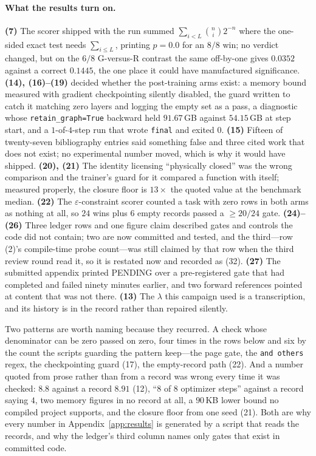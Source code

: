 \documentclass{article}
\begin{document}
\paragraph{What the results turn on.}
\textbf{(7)} The scorer shipped with the run summed $\sum_{i<L}\binom{n}{i}2^{-n}$ where
the one-sided exact test needs $\sum_{i\le L}$, printing $p = 0.0$ for an $8/8$ win; no
verdict changed, but on the $6/8$ G-versus-R contrast the same off-by-one gives $0.0352$
against a correct $0.1445$, the one place it could have manufactured significance.
\textbf{(14), (16)--(19)} decided whether the post-training arms exist: a memory bound
measured with gradient checkpointing silently disabled, the guard written to catch it
matching zero layers and logging the empty set as a pass, a diagnostic whose
\texttt{retain\_graph=True} backward held $91.67$\,GB against $54.15$\,GB at step start,
and a $1$-of-$4$-step run that wrote \texttt{final} and exited $0$.  \textbf{(15)}
Fifteen of twenty-seven bibliography entries said something false and three cited work
that does not exist; no experimental number moved, which is why it would have shipped.
\textbf{(20), (21)} The identity licensing ``physically closed'' was the wrong
comparison and the trainer's guard for it compared a function with itself; measured
properly, the closure floor is $13\times$ the quoted value at the benchmark median.
\textbf{(22)} The $\varepsilon$-constraint scorer counted a task with zero rows in both
arms as nothing at all, so $24$ wins plus $6$ empty records passed a $\ge 20/24$ gate.
\textbf{(24)--(26)} Three ledger rows and one figure claim described gates and controls
the code did not contain; two are now committed and tested, and the third---row (2)'s
compile-time probe count---was still claimed by that row when the third review round read
it, so it is restated now and recorded as (32).  \textbf{(27)} The submitted appendix printed PENDING
over a pre-registered gate that had completed and failed ninety minutes earlier, and two
forward references pointed at content that was not there.  \textbf{(13)} The $\lambda$
this campaign used is a transcription, and its history is in the record rather than
repaired silently.

Two patterns are worth naming because they recurred.  A check whose denominator can be
zero passed on zero, four times in the rows below and six by the count the scripts
guarding the pattern keep---the page gate, the \texttt{and others} regex, the
checkpointing guard (17), the empty-record path (22).  And a number quoted from prose
rather than from a record was wrong every time it was checked: $8.8$ against a record
$8.91$ (12), ``8 of 8 optimizer steps'' against a record saying $4$, two memory figures
in no record at all, a $90$\,KB lower bound no compiled project supports, and the
closure floor from one seed (21).  Both are why every number in
Appendix~\ref{app:results} is generated by a script that reads the records, and why the
ledger's third column names only gates that exist in committed code.
\end{document}

